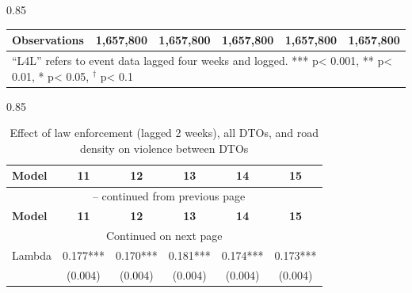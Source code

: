 \documentclass[12pt,letterpaper]{article}
\begin{document}
\begin{landscape}
\begin{center}
\begin{spacing}{0.85}
\begin{longtable}{lccccc}
Observations & 1,657,800 & 1,657,800 & 1,657,800 & 1,657,800 & 1,657,800 \\ \hline


\hline  
\multicolumn{6}{l}{``L4L'' refers to event data lagged four weeks and logged.  *** p< 0.001, ** p< 0.01, * p< 0.05, $^{\dag}$ p< 0.1} \\
 

\end{longtable}
\end{spacing}
\end{center}






\begin{center}
\small
\begin{spacing}{0.85}
\begin{longtable}{lccccc}

\caption{Effect of law enforcement (lagged 2 weeks), all DTOs, and road density on violence between DTOs} \label{tab:enforcement_allDTOs_Road_L2L} \\

\hline 
\multicolumn{1}{l}{\textbf{Model }} &\multicolumn{1}{c}{\textbf{11}} & \multicolumn{1}{c}{\textbf{12}} & \multicolumn{1}{c}{\textbf{13}} & \multicolumn{1}{c}{\textbf{14}} & \multicolumn{1}{c}{\textbf{15}} \\ \hline 
\endfirsthead


\multicolumn{6}{c}{{\tablename\ \thetable{} -- continued from previous page}} \\ \hline
\multicolumn{1}{l}{\textbf{Model }} &\multicolumn{1}{c}{\textbf{11}} & \multicolumn{1}{c}{\textbf{12}} & \multicolumn{1}{c}{\textbf{13}} & \multicolumn{1}{c}{\textbf{14}} & \multicolumn{1}{c}{\textbf{15}} \\ \hline 
\endhead

\hline \multicolumn{6}{c}{{Continued on next page}} \\ \hline
\endfoot

\hline \hline
\endlastfoot
                
Lambda  & 0.177*** & 0.170*** & 0.181*** & 0.174*** & 0.173*** \\
 & (0.004)  & (0.004)  & (0.004)  & (0.004)  & (0.004)  \\
                

\end{longtable}
\end{spacing}
\end{center}
\end{landscape}
\end{document}
